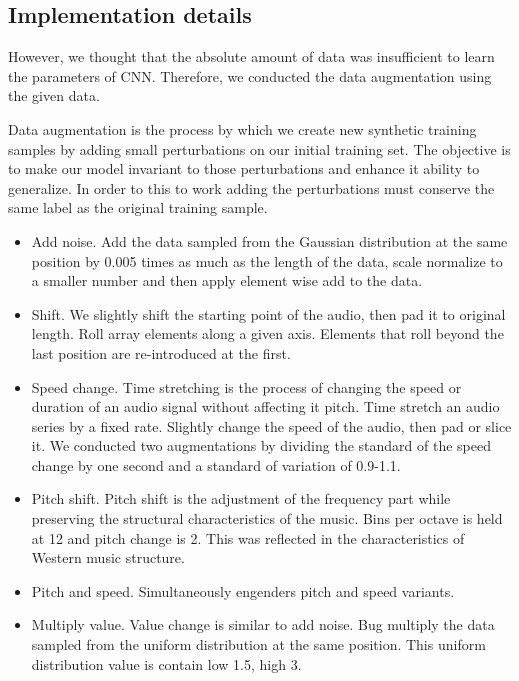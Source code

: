 \documentclass[journal]{IEEEtran}
\begin{document}
\subsection{Implementation details}
However, we thought that the absolute amount of data was insufficient to learn the parameters of CNN.
Therefore, we conducted the data augmentation using the given data.


Data augmentation is the process by which we create new synthetic training samples by adding small perturbations on our initial training set.
The objective is to make our model invariant to those perturbations and enhance it ability to generalize.
In order to this to work adding the perturbations must conserve the same label as the original training sample.

\begin{itemize}
	\item Add noise. 
	Add the data sampled from the Gaussian distribution at the same position by 0.005 times as much as the length of the data, scale normalize to a smaller number and then apply element wise add to the data.
	
	\item Shift. We slightly shift the starting point of the audio, then pad it to original length.
	Roll array elements along a given axis.
	Elements that roll beyond the last position are re-introduced at the first.
	
	\item Speed change. 
	Time stretching is the process of changing the speed or duration of an audio signal without affecting it pitch.
	Time stretch an audio series by a fixed rate.
	Slightly change the speed of the audio, then pad or slice it.
	We conducted two augmentations by dividing the standard of the speed change by one second and a standard of variation of 0.9-1.1.
	
	\item  Pitch shift.
	Pitch shift is the adjustment of the frequency part while preserving the structural characteristics of the music.
	Bins per octave is held at 12 and pitch change is 2.
	This was reflected in the characteristics of Western music structure.
	
	\item Pitch and speed.
	Simultaneously engenders pitch and speed variants.
	
	\item Multiply value.
	Value change is similar to add noise.
	Bug multiply the data sampled from the uniform distribution at the same position.
	This uniform distribution value is contain low 1.5, high 3.
	

\end{itemize}
\end{document}

